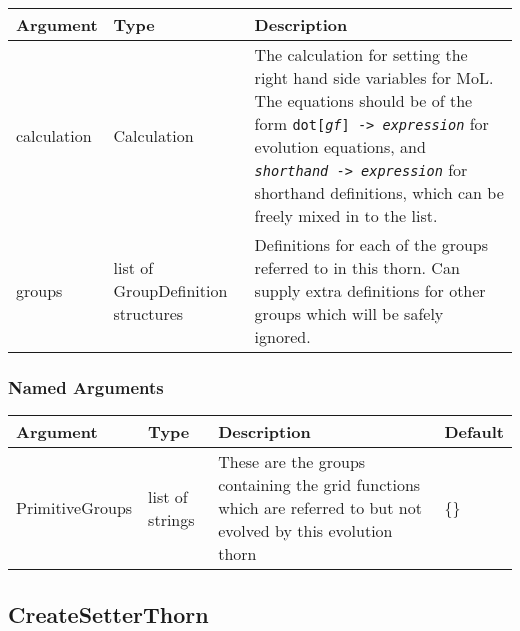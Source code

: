 \documentclass{report}
\newcommand{\tablewidth}{\textwidth}
\begin{document}
\begin{center}
\begin{tabularx}{\tablewidth}{|l|l|X|}
  \hline
  \bf Argument & \bf Type & \bf Description \\
  \hline
  calculation & Calculation & The calculation for setting the right hand side variables
                              for MoL.  The equations should be of the form
                              {\tt dot[{\it gf}] -> {\it expression}} for evolution equations, and
                              {\tt {\it shorthand} -> {\it expression}} for shorthand definitions, which can
                              be freely mixed in to the list.\\
  groups & list of GroupDefinition structures 

& Definitions for each of the groups referred to in this thorn. Can
  supply extra definitions for other groups which will be safely
  ignored. \\
  \hline
\end{tabularx}
\end{center}

\subsubsection{Named Arguments}

\begin{center}
\begin{tabularx}{\tablewidth}{|l|l|X|l|}
  \hline
  \bf Argument & \bf Type & \bf Description & \bf Default\\
  \hline
  PrimitiveGroups & list of strings & These are the groups containing the grid functions which are
                                      referred to but not evolved by this evolution thorn & \{\}  \\
  \hline
\end{tabularx}
\end{center}



\subsection{CreateSetterThorn}
\label{app:CreateSetterThorn}
\end{document}
